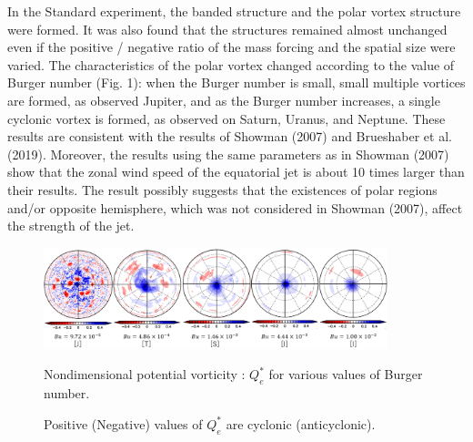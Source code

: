 \documentclass[a4j,8pt]{jarticle}
\begin{document}
In the Standard experiment,
the banded structure and the polar vortex structure were formed.
%
It was also found that the structures remained almost unchanged
even if the positive / negative
ratio of the mass forcing and the spatial size were varied.
%
The characteristics of the polar vortex changed according to the value of Burger number (Fig. 1):
when the Burger number is small,
small multiple vortices are formed, as observed Jupiter,
and as the Burger number increases,
a single cyclonic vortex is formed, as observed on Saturn, Uranus, and Neptune.
%
These results are consistent with the results of Showman (2007) and Brueshaber et al. (2019).
%
Moreover, the results using the same parameters as in Showman (2007) show that
the zonal wind speed of the equatorial jet is
about 10 times larger than their results.
%
The result possibly suggests that the existences of polar regions and/or opposite hemisphere,
which was not considered in Showman (2007), affect the strength of the jet.
%
\begin{figure}[b]
  \begin{center}
  \includegraphics[width=10cm]{./fig/case1_nonqv_a.png}
  \caption{ \footnotesize Nondimensional potential vorticity : $Q_e^*$ for various values of Burger number.}
\captionsetup{labelformat=empty,labelsep=none}
\caption{\footnotesize Positive (Negative) values of $Q_e^*$ are cyclonic (anticyclonic).}
  \label{case1:nonqv_a}
  \end{center}
\end{figure}
%
%
\end{document}
